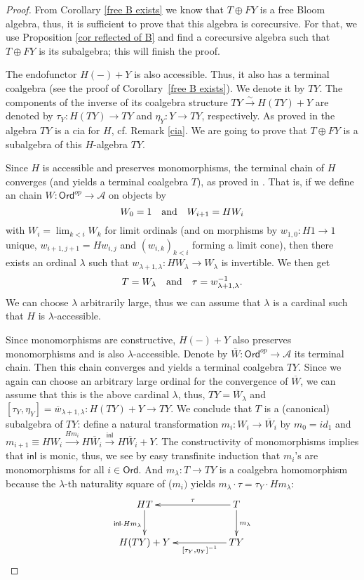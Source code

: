 \documentclass{LMCS}
\theoremstyle{plain}
\theoremstyle{definition}
\numberwithin{equation}{section}
\begin{document}
\begin{proof}
From Corollary \ref{free B exists} we know that $T\oplus FY$ is a free Bloom algebra, thus, it is sufficient to prove that this algebra is corecursive. For that, we use Proposition \ref{cor reflected of B} and find a corecursive algebra such that $T\oplus FY$ is its subalgebra; this will finish the proof.

The endofunctor $H(-)+Y$ is also accessible. Thus, it also has a terminal
coalgebra (see the proof of Corollary~\ref{free B exists}). We denote it by
$TY$. The components of the inverse of its coalgebra structure
$TY\stackrel{\sim}\rightarrow H(TY)+Y$ are denoted by
$\tau_Y:H(TY)\rightarrow TY$ and $\eta_Y:Y\rightarrow TY$, respectively. As proved in \cite{m_cia} the algebra $TY$ is a cia for $H$, cf. Remark \ref{cia}. We are going to prove that $T\oplus FY$ is a subalgebra of this $H$-algebra $TY$.

Since $H$ is accessible and preserves monomorphisms, the terminal chain
of $H$ converges (and yields a terminal coalgebra $T$), as proved in \cite{at2}. That is, if we define an chain $W:\mathsf{Ord}^{op}\rightarrow \mathcal A$ on objects by
$$W_0=1\ \ \ {\rm and}\ \ \ W_{i+1}=HW_i$$
with $W_i=\lim_{k<i}W_k$ for limit ordinals  (and on morphisms by
$w_{1,0}:H1\rightarrow 1$ unique, $w_{i+1,j+1}=Hw_{i,j}$ and
$(w_{i,k})_{k<i}$ forming a limit cone), then there exists an ordinal
$\lambda$ such that $w_{\lambda+1,\lambda}:HW_\lambda\rightarrow
W_\lambda$ is invertible. We then get 
$$T=W_\lambda\ \ \ {\rm and}\ \ \ \tau=w_{\lambda+1,\lambda}^{-1}.$$
We can choose $\lambda$ arbitrarily large, thus we can assume that $\lambda$ is a cardinal such that $H$ is $\lambda$-accessible.

Since monomorphisms are constructive, $H(-)+Y$ also preserves monomorphisms and is also $\lambda$-accessible. Denote by $\overline W:\mathsf{Ord}^{op}\rightarrow \mathcal A$ its terminal chain. Then this chain converges and yields a terminal coalgebra $TY$. Since we again can choose an arbitrary large ordinal for the convergence of $\overline W$, we can assume that this is the above cardinal $\lambda$, thus, $TY=\overline W_\lambda$ and $[\tau_Y,\eta_Y]=\overline w_{\lambda+1,\lambda}:H(TY)+Y\rightarrow TY$. We conclude that $T$ is a (canonical) subalgebra of $TY$: define a natural transformation $m_i:W_i\rightarrow \overline W_i$ by $m_0=id_1$ and $m_{i+1}\equiv HW_i\stackrel{Hm_i}\longrightarrow H\overline W_i\stackrel{\mathsf{inl}}\longrightarrow H\overline W_i+Y$. The constructivity of monomorphisms implies that $\mathsf{inl}$ is monic, thus, we see by easy transfinite induction that $m_i$'s are monomorphisms for all $i\in \mathsf{Ord}$. And $m_\lambda:T\rightarrow TY$ is a coalgebra homomorphism because the $\lambda$-th naturality square of ($m_i)$ yields $m_\lambda\cdot\tau=\tau_Y\cdot Hm_\lambda$:
$$
\xymatrix{
HT\ar[d]_{\mathsf{inl}\cdot Hm_\lambda}&&T\ar[ll]_-{\tau}\ar[d]^{m_\lambda}\\
H(TY)+Y&&TY\ar[ll]^-{[\tau_Y,\eta_Y]^{-1}}
}
$$


\end{proof}
\end{document}
